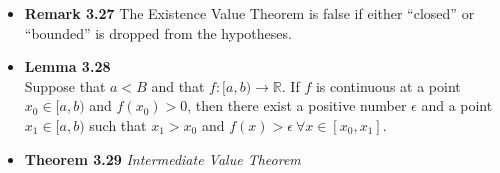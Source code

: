 \documentclass[11pt,a4paper]{article}
\begin{document}
\begin{itemize}
    \item \textbf{Remark 3.27}
        The Existence Value Theorem is false if either ``closed'' or ``bounded'' is dropped
        from the hypotheses.

    \item \textbf{Lemma 3.28} \\
        Suppose that $a < B$ and that $f : [a, b) \to \mathbb{R}$.
        If $f$ is continuous at a point $x_0 \in [a,b)$ and $f(x_0) > 0$,
        then there exist a positive number $\epsilon$ and a point
        $x_1 \in [a, b)$ such that $x_1 > x_0$ and $f(x) > \epsilon \ \forall
        x \in [x_0, x_1]$.

    \item \textbf{Theorem 3.29} \emph{Intermediate Value Theorem} \\


\end{itemize}
\end{document}

